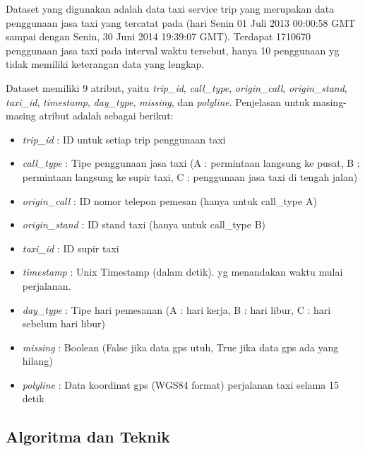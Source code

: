 \documentclass{article}
\begin{document}
\begin{adjustwidth}{2em}{0pt}

\hspace{\parindent}Dataset yang digunakan adalah data taxi service trip yang merupakan data penggunaan jasa taxi yang tercatat pada (hari Senin 01 Juli 2013 00:00:58 GMT sampai dengan Senin, 30 Juni 2014 19:39:07 GMT). Terdapat 1710670 penggunaan jasa taxi pada interval waktu tersebut, hanya 10 penggunaan yg tidak memiliki keterangan data yang lengkap.

Dataset memiliki 9 atribut, yaitu \textit{trip\_id}, \textit{call\_type}, \textit{origin\_call}, \textit{origin\_stand}, \textit{taxi\_id}, \textit{timestamp}, \textit{day\_type}, \textit{missing}, dan \textit{polyline}. Penjelasan untuk masing-masing atribut adalah sebagai berikut:

\begin{itemize}
\item{\textit{trip\_id} : ID untuk setiap trip penggunaan taxi}
\item{\textit{call\_type} : Tipe penggunaan jasa taxi (A : permintaan langsung ke pusat, B : permintaan langsung ke supir taxi, C : penggunaan jasa taxi di tengah jalan)}
\item{\textit{origin\_call} : ID nomor telepon pemesan (hanya untuk call\_type A)}
\item{\textit{origin\_stand} : ID stand taxi (hanya untuk call\_type B)}
\item{\textit{taxi\_id} : ID supir taxi}
\item{\textit{timestamp} : Unix Timestamp (dalam detik). yg menandakan waktu mulai perjalanan.}
\item{\textit{day\_type} :  Tipe hari pemesanan (A : hari kerja, B : hari libur, C : hari sebelum hari libur)}
\item{\textit{missing} : Boolean (False jika data gps utuh, True jika data gps ada yang hilang)}
\item{\textit{polyline} : Data koordinat gps (WGS84 format) perjalanan taxi selama 15 detik}
\end{itemize}

\end{adjustwidth}

\subsection{Algoritma dan Teknik}
\end{document}
